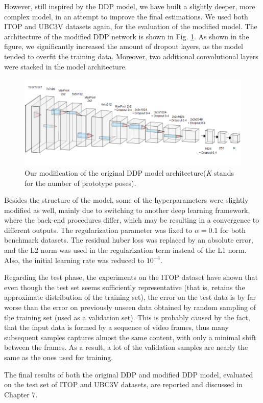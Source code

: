 \noindent
However, still inspired by the DDP model, we have built a slightly deeper, more complex model, in an attempt to improve the final estimations. We used both ITOP and UBC3V datasets again, for the evaluation of the modified model.
The architecture of the modified DDP network is shown in Fig. \ref{fig:mddp}. As shown in the figure, we significantly increased the amount of dropout layers, as the model tended to overfit the training data. Moreover, two additional convolutional layers were stacked in the model architecture.\par
\vspace{5mm}

\begin{figure}[H]
\begin{center}
  \includegraphics[width=\textwidth]{images/implementation/mddp.png}
  \caption[Our modification of the original DDP model architecture.]{Our modification of the original DDP model architecture\break (\textit{K} stands for the number of prototype poses).}
  \label{fig:mddp}
\end{center}
\end{figure}


\noindent Besides the structure of the model, some of the hyperparameters were slightly modified as well, mainly due to switching to another deep learning framework, where the back-end procedures differ, which may be resulting in a convergence to different outputs. The regularization parameter was fixed to $\alpha = 0.1$ for both benchmark datasets. The residual huber loss was replaced by an absolute error, and the L2 norm was used in the regularization term instead of the L1 norm. Also, the initial learning rate was reduced to $10^{-4}$.\par
\vspace{5mm}
\noindent Regarding the test phase, the experiments on the ITOP dataset have shown that even though the test set seems sufficiently representative (that is, retains the approximate distribution of the training set), the error on the test data is by far worse than the error on previously unseen data obtained by random sampling of the training set (used as a validation set). This is probably caused by the fact, that the input data is formed by a sequence of video frames, thus many subsequent samples captures almost the same content, with only a minimal shift between the frames. As a result, a lot of the validation samples are nearly the same as the ones used for training.\par
\vspace{5mm}
\noindent
The final results of both the original DDP and modified DDP model, evaluated on the test set of ITOP and UBC3V datasets, are reported and discussed in Chapter 7.


